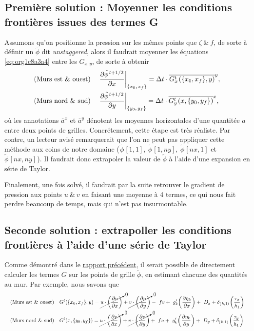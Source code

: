 \documentclass[10pt]{article}
\numberwithin{equation}{section}
\newcommand{\pt}{\hspace{1pt}} %
\newcommand{\xmean}[1]{\overline{#1}^x}
\newcommand{\ymean}[1]{\overline{#1}^y}
\begin{document}
\subsection{Première solution : Moyenner les conditions frontières issues des termes G}
\label{sec:org6640355}

Assumons qu'on positionne la pression sur les mêmes points que \(\zeta\ \& \ f\), de sorte à définir un \(\tilde{\phi}\) dit \emph{unstaggered}, alors il faudrait moyenner les équations \ref{eq:org1c8a3a4} entre les \(G_{x,y}\), de sorte à obtenir
\begin{subequations}
\label{eq:orgccbba6d}
\begin{align}
&& &\text{(Murs est \& ouest)}
&&\eval{\pdv{\tilde{\phi}^{\pt t+1/2}}{x}}_\qty{x_0,\pt x_f}
= \Delta t\cdot \ymean{G^t_x\pt (\{x_0,x_f\},y)},&&\\
&& &\text{(Murs nord \& sud)}
&&\eval{\pdv{\tilde{\phi}^{\pt t+1/2}}{y}}_\qty{y_0,\pt y_f}
=  \Delta t\cdot \xmean{G^t_y\pt (x,\{y_0,y_f\})},&&
\end{align}
\end{subequations}
où les annotations \(\xmean{a}\) et \(\ymean{a}\) dénotent les moyennes horizontales d'une quantitée \(a\) entre deux points de grilles.
Concrétement, cette étape est très réaliste.
Par contre, un lecteur avisé remarquerait que l'on ne peut pas appliquer cette méthode aux coins de notre domaine (\(\pt \tilde{\phi}\pt[1,1],\ \tilde{\phi}\pt[1,ny],\ \tilde{\phi}\pt[nx,1]\) et \(\tilde{\phi}\pt[nx,ny]\pt\)).
Il faudrait donc extrapoler la valeur de \(\tilde{\phi}\) à l'aide d'une expansion en série de Taylor.\bigskip

Finalement, une fois solvé, il faudrait par la suite retrouver le gradient de pression aux points \(u\ \&\ v\) en faisant une moyenne à 4 termes, ce qui nous fait perdre beaucoup de temps, mais qui n'est pas insurmontable.

\subsection{Seconde solution : extrapoller les conditions frontières à l'aide d'une série de Taylor}
\label{sec:org02d208f}
Comme démontré dans le \href{rapport-2023-04-21.org}{rapport précédent}, il serait possible de directement calculer les termes \(G\) sur les points de grille \(\tilde{\phi}\), en estimant chacune des quantités au mur.
Par exemple, nous savons que 
\begin{subequations}
\begin{align}
&& &\text{(Murs est \& ouest)}&&
G^t(\{x_0,x_f\},y) =
\cancelto{0}{u \cdot \qty(\pdv{u}{x})} + \cancelto{0}{v \cdot \qty(\pdv{u}{y})}
-\ fv
+\ g'_{k} \qty(\pdv{\eta_k}{x})
+\ D_x
+\delta_\qty(\pt k,1)\pt \qty(\frac{\tau_x}{h_1})&&\\
%
&& &\text{(Murs nord \& sud)} &&
G^t(x,\{y_0,y_f\}) =
\cancelto{0}{u \cdot \qty(\pdv{v}{x})} + \cancelto{0}{v \cdot \qty(\pdv{v}{y})}
+\ fu
+\ g'_{k} \qty(\pdv{\eta_k}{y})
+\ D_y
+\delta_\qty(\pt k,1)\pt \qty(\frac{\tau_y}{h_1})&&
\end{align}
\end{subequations}
\end{document}
